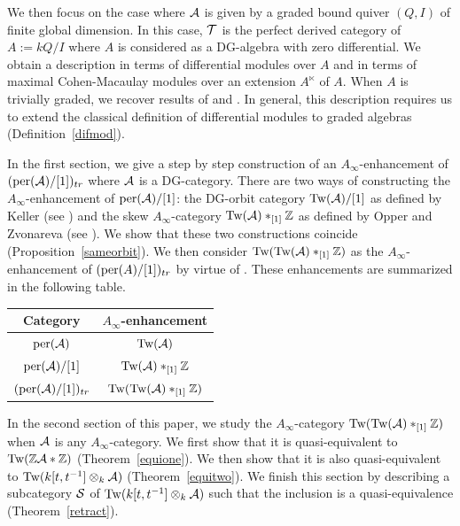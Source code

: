 \documentclass[12pt]{article}
\begin{document}
	We then focus on the case where ${\cal{A}}$ is given by a graded bound quiver $(Q,I)$ of finite global dimension. In this case, ${\cal{T}}$ is the perfect derived category of $A:= kQ/I$ where $A$ is considered as a DG-algebra with zero differential. We obtain a description in terms of differential modules over $A$ and in terms of maximal Cohen-Macaulay modules over an extension $A^\ltimes$ of $A$. When $A$ is trivially graded, we recover results of \cite{Stai} and \cite{Win}. In general, this description requires us to extend the classical definition of differential modules to graded algebras (Definition~\ref{difmod}). 
	
	In the first section, we give a step by step construction of an $A_\infty$-enhancement of $(\textup{per}({\cal{A}})/[1])_{tr}$ where ${\cal{A}}$ is a DG-category. There are two ways of constructing the $A_\infty$-enhancement of $\textup{per}({\cal{A}})/[1]$: the DG-orbit category $\textup{Tw}({\cal{A}})/[1]$ as defined by Keller (see \cite{KelOrb}) and the skew $A_\infty$-category $\textup{Tw}({\cal{A}}) *_{[1]} \mathbb{Z}$ as defined by Opper and Zvonareva (see \cite{OZ}). We show that these two constructions coincide (Proposition~\ref{sameorbit}). We then consider $\textup{Tw}(\textup{Tw}({\cal{A}}) *_{[1]} \mathbb{Z})$ as the $A_\infty$-enhancement of $(\textup{per}(A)/[1])_{tr}$ by virtue of \cite[Section~7.4]{Lef}. These enhancements are summarized in the following table.
	
	\begin{center}
		\begin{tabular}{|c|c|}
			\hline 
			Category & $A_\infty$-enhancement \\
			\hline
			$\textup{per}({\cal{A}})$ & $\textup{Tw}({\cal{A}})$ \\
			$\textup{per}({\cal{A}})/[1]$ & $\textup{Tw}({\cal{A}}) *_{[1]} \mathbb{Z}$  \\
			$(\textup{per}({\cal{A}})/[1])_{tr}$ & $\textup{Tw}(\textup{Tw}({\cal{A}}) *_{[1]} \mathbb{Z})$ \\
			\hline
		\end{tabular}
	\end{center}
	
	In the second section of this paper, we study the $A_\infty$-category $\textup{Tw}(\textup{Tw}({\cal{A}}) *_{[1]} \mathbb{Z})$ when ${\cal{A}}$ is any $A_\infty$-category. We first show that it is quasi-equivalent to $\textup{Tw}(\mathbb{Z} {\cal{A}} * \mathbb{Z})$ (Theorem~\ref{equione}). We then show that it is also quasi-equivalent to $\textup{Tw}(k[t,t^{-1}] \otimes_k {\cal{A}})$ (Theorem~\ref{equitwo}). We finish this section by describing a subcategory ${\cal{S}}$ of $\textup{Tw}(k[t,t^{-1}] \otimes_k {\cal{A}})$ such that the inclusion is a quasi-equivalence (Theorem~\ref{retract}). 
	
\end{document}
